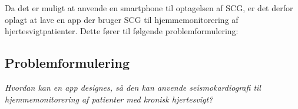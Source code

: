Da det er muligt at anvende en smartphone til optagelsen af SCG, er det derfor oplagt at lave en app der bruger SCG til hjemmemonitorering af hjertesvigtpatienter. Dette fører til følgende problemformulering:

\subsection{Problemformulering}

\begin{displayquote}
\textit{Hvordan kan en app designes, så den kan anvende seismokardiografi til hjemmemonitorering af patienter med kronisk hjertesvigt?}
\end{displayquote}

